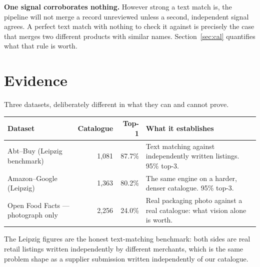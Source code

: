 \textbf{One signal corroborates nothing.} However strong a text match is, the
pipeline will not merge a record unreviewed unless a second, independent signal
agrees. A perfect text match with nothing to check it against is precisely the
case that merges two different products with similar names. Section~\ref{sec:cal}
quantifies what that rule is worth.

\section{Evidence}

Three datasets, deliberately different in what they can and cannot prove.

\begin{center}
\begin{tabular}{@{}p{5.0cm}rrp{5.6cm}@{}}
\toprule
\textbf{Dataset} & \textbf{Catalogue} & \textbf{Top-1} & \textbf{What it establishes} \\
\midrule
Abt--Buy (Leipzig benchmark)     & 1{,}081 & 87.7\% & Text matching against independently written listings. 95\% top-3. \\
Amazon--Google (Leipzig)         & 1{,}363 & 80.2\% & The same engine on a harder, denser catalogue. 95\% top-3. \\
Open Food Facts --- photograph only & 2{,}256 & 24.0\% & Real packaging photo against a real catalogue: what vision alone is worth. \\
\bottomrule
\end{tabular}
\end{center}

The Leipzig figures are the honest text-matching benchmark: both sides are real
retail listings written independently by different merchants, which is the same
problem shape as a supplier submission written independently of our catalogue.


